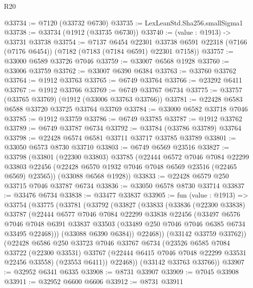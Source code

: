 \begin{lexlean}{R20}
\begin{coremodule}
{@33734 := @7120 (@33732 @6730)
@33735 := LexLeanStd.Sha256.smallSigma1
@33738 := @33734 (@1912 (@33735 @6730))
@33740 := (value : @1913) -> @33731 @33738
@33754 := @7137
    @6454
    @22301
    @33738
    @6591
    @22318
    (@7166 (@7176 @6454))
    (@7182 (@7183 (@7184 @6591) @22301 @7158))
@33757 := @33000 @6589 @33726 @7046
@33759 := @33007 @6568 @1928
@33760 := @33006 @33759
@33762 := @33007 @6390 @6384
@33763 := @33760 @33762
@33764 := @1912 @33763
@33765 := @6749 @33764
@33766 := @23292 @6411
@33767 := @1912 @33766
@33769 := @6749 @33767 @6734
@33775 := @33757 (@33765 @33769) (@1912 (@33006 @33763 @33766))
@33781 := @22428 @6583 @6588 @33720 @33725 @33764 @33769
@33784 := @33000 @6582 @33718 @7046
@33785 := @1912 @33759
@33786 := @6749 @33785
@33787 := @1912 @33762
@33789 := @6749 @33787 @6734
@33792 := @33784 (@33786 @33789) @33764
@33798 := @22428 @6574 @6581 @33711 @33717 @33785 @33789
@33801 := @33050 @6573 @8730 @33710
@33803 := @6749 @6569 @23516
@33827 := @33798
    (@33801
      (@22300 @33803)
      @33785
      (@22444
        @6572
        @7046
        @7084
        @22299
        @33803
        @22456
        (@22428 @6570 @1932 @7046 @7048 @6569 @23516 (@22465 @6569) @23565))
      (@33088 @6568 @1928))
@33833 := @22428 @6579 @250 @33715 @7046 @33787 @6734
@33836 := @33050 @6578 @8730 @33714
@33837 := @33476 @6734
@33838 := @33477 @33837
@33905 := fun (value : @1913) =>
  @33754
    (@33775
      (@33781
        (@33792
          (@33827
            (@33833
              (@33836
                (@22300 @33838)
                @33787
                (@22444
                  @6577
                  @7046
                  @7084
                  @22299
                  @33838
                  @22456
                  (@33497
                    @6576
                    @7046
                    @7048
                    @6391
                    @33837
                    @33503
                    (@33489 @250 @7046 @7046 @6385 @6734 @33495 @22468)))
                (@33088 @6390 @6384))
              @22468))
          (@33142 @33759 @33762))
        (@22428
          @6586
          @250
          @33723
          @7046
          @33767
          @6734
          (@23526
            @6585
            @7084
            @33722
            (@22300 @33531)
            @33767
            (@22444 @6415 @7046 @7048 @22299 @33531 @22456 @33558)
            (@23553 @6411))
          @22468))
      (@33142 @33763 @33766))
@33907 := @32952 @6341 @6335
@33908 := @8731 @33907
@33909 := @7045 @33908
@33911 := @32952 @6600 @6606
@33912 := @8731 @33911
}
\end{coremodule}
\end{lexlean}
